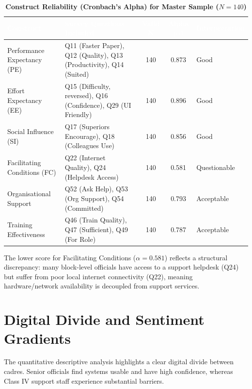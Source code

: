 \documentclass[10pt,a4paper]{article}
\begin{document}
\begin{table}[h!]
\centering
\footnotesize
\caption{\textbf{Construct Reliability (Cronbach's Alpha) for Master Sample ($N=140$)}}
\vspace{0.1cm}
\begin{tabularx}{\textwidth}{l X c c l}
\toprule
\rowcolor{navyblue}
\textcolor{white}{\textbf{Construct}} & \textcolor{white}{\textbf{Survey Questions Included}} & \textcolor{white}{\textbf{Valid N}} & \textcolor{white}{\textbf{Alpha ($\alpha$)}} & \textcolor{white}{\textbf{Interpretation}} \\
\midrule
Performance Expectancy (PE) & Q11 (Faster Paper), Q12 (Quality), Q13 (Productivity), Q14 (Suited) & 140 & 0.873 & Good \\
Effort Expectancy (EE) & Q15 (Difficulty, reversed), Q16 (Confidence), Q29 (UI Friendly) & 140 & 0.896 & Good \\
Social Influence (SI) & Q17 (Superiors Encourage), Q18 (Colleagues Use) & 140 & 0.856 & Good \\
Facilitating Conditions (FC) & Q22 (Internet Quality), Q24 (Helpdesk Access) & 140 & 0.581 & Questionable \\
Organisational Support & Q52 (Ask Help), Q53 (Org Support), Q54 (Committed) & 140 & 0.793 & Acceptable \\
Training Effectiveness & Q46 (Train Quality), Q47 (Sufficient), Q49 (For Role) & 140 & 0.787 & Acceptable \\
\bottomrule
\end{tabularx}
\end{table}

The lower score for Facilitating Conditions ($\alpha = 0.581$) reflects a structural discrepancy: many block-level officials have access to a support helpdesk (Q24) but suffer from poor local internet connectivity (Q22), meaning hardware/network availability is decoupled from support services.

\section{Digital Divide and Sentiment Gradients}
The quantitative descriptive analysis highlights a clear digital divide between cadres. Senior officials find systems usable and have high confidence, whereas Class IV support staff experience substantial barriers.
\end{document}
